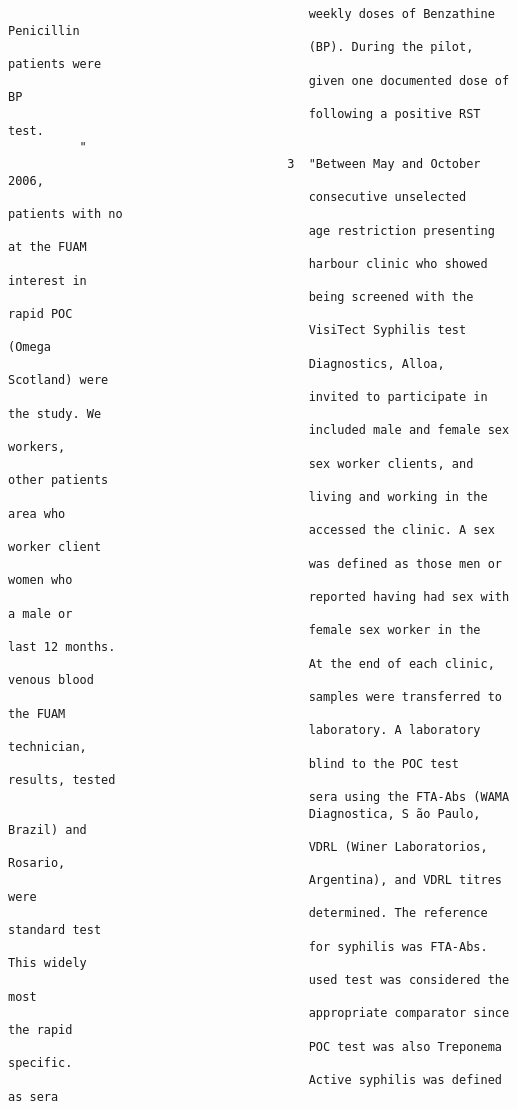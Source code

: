 \documentclass{article}
\begin{document}
\begin{verbatim}
                                          weekly doses of Benzathine Penicillin
                                          (BP). During the pilot, patients were
                                          given one documented dose of BP
                                          following a positive RST test.
          "
                                       3  "Between May and October 2006,
                                          consecutive unselected patients with no
                                          age restriction presenting at the FUAM
                                          harbour clinic who showed interest in
                                          being screened with the rapid POC
                                          VisiTect Syphilis test (Omega
                                          Diagnostics, Alloa, Scotland) were
                                          invited to participate in the study. We
                                          included male and female sex workers,
                                          sex worker clients, and other patients
                                          living and working in the area who
                                          accessed the clinic. A sex worker client
                                          was defined as those men or women who
                                          reported having had sex with a male or
                                          female sex worker in the last 12 months.
                                          At the end of each clinic, venous blood
                                          samples were transferred to the FUAM
                                          laboratory. A laboratory technician,
                                          blind to the POC test results, tested
                                          sera using the FTA-Abs (WAMA
                                          Diagnostica, S ̃ao Paulo, Brazil) and
                                          VDRL (Winer Laboratorios, Rosario,
                                          Argentina), and VDRL titres were
                                          determined. The reference standard test
                                          for syphilis was FTA-Abs. This widely
                                          used test was considered the most
                                          appropriate comparator since the rapid
                                          POC test was also Treponema specific.
                                          Active syphilis was defined as sera

\end{verbatim}
\end{document}
